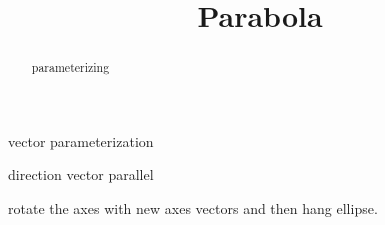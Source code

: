 \documentclass{ximera}
\title{Parabola}
\begin{document}
\begin{abstract}
parameterizing
\end{abstract}
\maketitle



vector parameterization


direction vector parallel



rotate the axes with new axes vectors and then hang ellipse.
\end{document}
